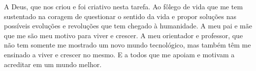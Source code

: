 A Deus, que nos criou e foi criativo nesta tarefa. Ao fôlego de vida que me tem sustentado na coragem de questionar o sentido da vida e propor soluções nas possíveis evoluções e revoluções que tem chegado à humanidade. A meu pai e mãe que me são meu motivo para viver e crescer. A meu orientador e professor, que não tem somente me mostrado um novo mundo tecnológico, mas também têm me ensinado a viver e crescer no mesmo. E a todos que me apoiam e motivam a acreditar em um mundo melhor.